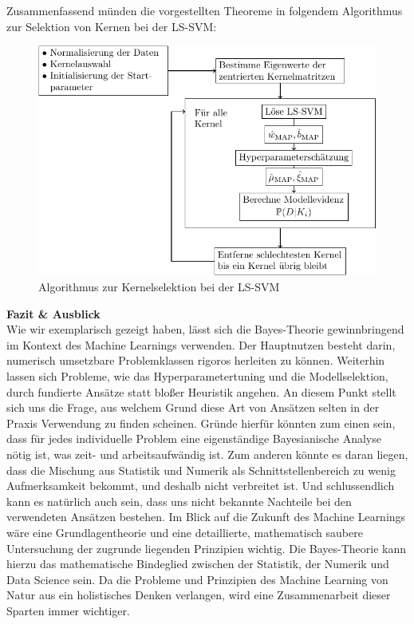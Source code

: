 Zusammenfassend münden die vorgestellten Theoreme in folgendem Algorithmus zur Selektion von Kernen bei der LS-SVM:

\begin{center}
	\begin{figure}
		\includegraphics[scale=0.9]{Algo.pdf}
		\caption{Algorithmus zur Kernelselektion bei der LS-SVM}
	\end{figure}
\end{center}

\newpage
\thispagestyle{plain}
\noindent\textbf{Fazit \& Ausblick}\\
Wie wir exemplarisch gezeigt haben, lässt sich die Bayes-Theorie gewinnbringend im Kontext des Machine Learnings verwenden. Der Hauptnutzen besteht darin, numerisch umsetzbare Problemklassen rigoros herleiten zu können. Weiterhin lassen sich Probleme, wie das Hyperparametertuning und die Modellselektion, durch fundierte Ansätze statt bloßer Heuristik angehen. An diesem Punkt stellt sich uns die Frage, aus welchem Grund diese Art von Ansätzen selten in der Praxis Verwendung zu finden scheinen. Gründe hierfür könnten zum einen sein, dass für jedes individuelle Problem eine eigenständige Bayesianische Analyse nötig ist, was zeit- und arbeitsaufwändig ist. Zum anderen könnte es daran liegen, dass die Mischung aus Statistik und Numerik als Schnittstellenbereich zu wenig Aufmerksamkeit bekommt, und deshalb nicht verbreitet ist. Und schlussendlich kann es natürlich auch sein, dass uns nicht bekannte Nachteile bei den verwendeten Ansätzen bestehen. Im Blick auf die Zukunft des Machine Learnings wäre eine Grundlagentheorie und eine detaillierte, mathematisch saubere Untersuchung der zugrunde liegenden Prinzipien wichtig. Die Bayes-Theorie kann hierzu das mathematische Bindeglied zwischen der Statistik, der Numerik und Data Science sein. Da die Probleme und Prinzipien des Machine Learning von Natur aus ein holistisches Denken verlangen, wird eine Zusammenarbeit dieser Sparten immer wichtiger.